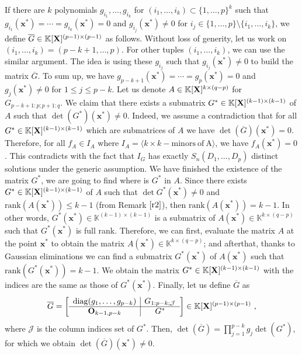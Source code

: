 \documentclass[11pt]{article}
\numberwithin{Property}{section}
\numberwithin{Theorem}{section}
\numberwithin{Proposition}{section}
\numberwithin{Lemma}{section}
\numberwithin{Corollary}{section}
\numberwithin{Definition}{section}
\numberwithin{Remark}{section}
\numberwithin{Conjecture}{section}
\numberwithin{Problem}{section}
\numberwithin{Example}{section}
\numberwithin{Claim}{section}
\renewcommand{\leq}{\leqslant}
\def\bar{\overline}
\newcommand{\field}{\mathbb{K}} %
\newcommand{\mat}[1]{\mathbf{\MakeUppercase{#1}}} %
\begin{document}
If there are $k$ polynomials $g_{i_1}, \ldots, g_{i_k}$ for $(i_1, \ldots, i_k) \subset \{1, \ldots, p\}^k$ such that $g_{i_1}(\mathbf{x}^*) = \cdots = g_{i_k}(\mathbf{x}^*) = 0$ and $g_{i_j}(\mathbf{x}^*) \ne 0$ for $i_j \in \{1, \ldots, p\} \setminus \{i_1, \ldots, i_k\}$, we define $\bar{G} \in \field[\mat{X}]^{(p-1) \times (p-1)}$ as follows. Without loss of generity, let us work on $(i_1, \ldots, i_k) = (p-k+1, \ldots, p)$. For other tuples $(i_1, \ldots, i_k)$, we can use the similar argument. The idea is using these $g_{i_j}$ such that $g_{i_j}(\mathbf{x}^*) \ne 0$ to build the matrix $\bar{G}$. To sum up, we have $g_{p-k+1}(\mathbf{x}^*) = \cdots = g_{p}(\mathbf{x}^*) = 0$ and $g_j(\mathbf{x}^*) \ne 0$ for $1 \leq j \leq p-k$. Let us denote $A \in \field[\mat{X}]^{k \times (q-p)}$ for $G_{p-k+1:p\mathbf{;}p+1:q}$. We claim that there exists a submatrix ${G}^* \in \field[\mat{X}]^{(k-1) \times (k-1)}$ of $A$ such that $\det({G}^*)(\mathbf{x}^*) \ne 0$. Indeed, we assume a contradiction that for all ${G}^* \in \field[\mat{X}]^{(k-1) \times (k-1)}$ which are submatrices of $A$ we have $\det(\bar{G})(\mathbf{x}^*) = 0$. Therefore, for all $f_{A} \in I_A$ where $I_A = \langle k \times k - \mathrm{minors \ of \ A}\rangle$, we have $f_A(\mathbf{x}^*) = 0$. This contradicts with the fact that $I_G$ has exactly $S_n(D_1, \ldots, D_p)$ distinct solutions under the generic assumption. We have finished the existence of the matrix ${G}^*$, we are going to find where is ${G}^*$ in $A$. Since there exists ${G}^* \in \field[\mat{X}]^{(k-1) \times (k-1)}$  of $A$ such that $\det{{G}^*}(\mathbf{x}^*) \ne 0$ and $\mathrm{rank}(A(\mathbf{x}^{*})) \leq k-1$ (from Remark $\ref{r2}$), then $\mathrm{rank}(A(\mathbf{x}^{*})) = k-1$. In other words, ${G}^*(\mathbf{x}^*) \in \field^{(k-1)\times (k-1)}$ is a submatrix of $A(\mathbf{x}^*) \in \field^{k \times (q-p)}$ such that ${G}^*(\mathbf{x}^*)$ is full rank. Therefore, we can first, evaluate the matrix $A$ at the point $\mathbf{x}^*$ to obtain the matrix $A(\mathbf{x}^*) \in \field^{k \times (q-p)}$; and afterthat, thanks to Gaussian eliminations we can find a submatrix ${G}^*(\mathbf{x}^*)$ of $A(\mathbf{x}^*)$ such that $\mathrm{rank}({G}^*(\mathbf{x}^*)) = k-1$.  We obtain the matrix ${G}^* \in \field[\mat{X}]^{(k-1) \times (k-1)}$ with the indices are the same as those of ${G}^*(\mathbf{x}^*)$. Finally, let us define $\bar{G}$ as 
$$\bar{G} = 
\left[\begin{array}{c |c}%
\mathrm{diag}(g_1, \ldots, g_{p-k}) & G_{1:p-k; \mathcal{J}} \\  \hline
\mat{O}_{k-1,p-k} & G^*\\
\end{array}
\right] \in \field[\mat{X}]^{(p-1) \times (p-1)} \ ,$$ where $\mathcal{J}$ is the column indices set of $G^*$. Then, $\det(\bar{G}) = \prod_{j = 1}^{p-k}g_j\det(G^*)$, for which we obtain $\det(\bar{G})(\mathbf{x}^*) \ne 0$. 
\end{document}
